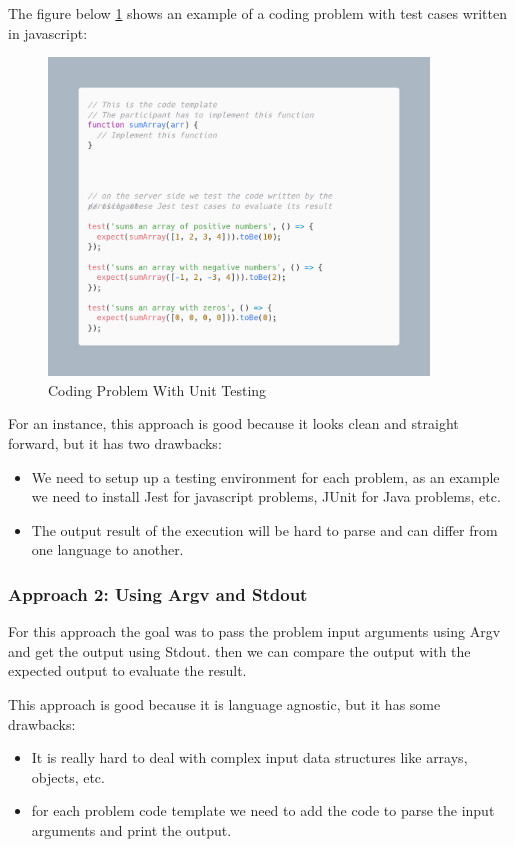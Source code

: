 The figure below \ref{fig:approach2} shows an example of a coding problem with test cases written in javascript:

\begin{figure}[h!]
  \centering
  \includegraphics[width=0.9\textwidth]{images/approach2.png}
  \caption{Coding Problem With Unit Testing}\label{fig:approach2}
\end{figure}

For an instance, this approach is good because it looks clean and straight forward, but it has two drawbacks:
\begin{itemize}
  \item We need to setup up a testing environment for each problem, as an example we need to install Jest for javascript problems, JUnit for Java problems, etc.
  \item The output result of the execution will be hard to parse and can differ from one language to another.
\end{itemize}

\subsubsection{Approach 2: Using Argv and Stdout}
For this approach the goal was to pass the problem input arguments using Argv and get the output using Stdout.
then we can compare the output with the expected output to evaluate the result.

This approach is good because it is language agnostic, but it has some drawbacks:
\begin{itemize}
  \item It is really hard to deal with complex input data structures like arrays, objects, etc.
  \item for each problem code template we need to add the code to parse the input arguments and print the output.
\end{itemize}

